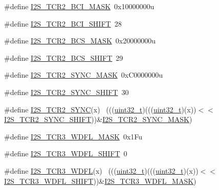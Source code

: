 \begin{DoxyCompactItemize}
\item 
\#define \hyperlink{group___i2_s___register___masks_ga1e16e8f58e2213ea6ea8fbe96f6b0b09}{I2\+S\+\_\+\+T\+C\+R2\+\_\+\+B\+C\+I\+\_\+\+M\+A\+SK}~0x10000000u
\item 
\#define \hyperlink{group___i2_s___register___masks_gaa9612abbad00a02a4d3dc1a7dfe6463d}{I2\+S\+\_\+\+T\+C\+R2\+\_\+\+B\+C\+I\+\_\+\+S\+H\+I\+FT}~28
\item 
\#define \hyperlink{group___i2_s___register___masks_ga8969a374d290181e8f2c7a1c5ff4f31b}{I2\+S\+\_\+\+T\+C\+R2\+\_\+\+B\+C\+S\+\_\+\+M\+A\+SK}~0x20000000u
\item 
\#define \hyperlink{group___i2_s___register___masks_ga4f9b5cf67219ec5115ced3b69bfda155}{I2\+S\+\_\+\+T\+C\+R2\+\_\+\+B\+C\+S\+\_\+\+S\+H\+I\+FT}~29
\item 
\#define \hyperlink{group___i2_s___register___masks_ga2626d37b42ede711d867e8f750fb2c2c}{I2\+S\+\_\+\+T\+C\+R2\+\_\+\+S\+Y\+N\+C\+\_\+\+M\+A\+SK}~0x\+C0000000u
\item 
\#define \hyperlink{group___i2_s___register___masks_ga7817b4e017fd01d7ca9a59e87008656f}{I2\+S\+\_\+\+T\+C\+R2\+\_\+\+S\+Y\+N\+C\+\_\+\+S\+H\+I\+FT}~30
\item 
\#define \hyperlink{group___i2_s___register___masks_ga09f26fa241803f9f821314538bfa520b}{I2\+S\+\_\+\+T\+C\+R2\+\_\+\+S\+Y\+NC}(x)                                              ~(((\hyperlink{_p_e___types_8h_a33594304e786b158f3fb30289278f5af}{uint32\+\_\+t})(((\hyperlink{_p_e___types_8h_a33594304e786b158f3fb30289278f5af}{uint32\+\_\+t})(x))$<$$<$\hyperlink{group___i2_s___register___masks_ga7817b4e017fd01d7ca9a59e87008656f}{I2\+S\+\_\+\+T\+C\+R2\+\_\+\+S\+Y\+N\+C\+\_\+\+S\+H\+I\+FT}))\&\hyperlink{group___i2_s___register___masks_ga2626d37b42ede711d867e8f750fb2c2c}{I2\+S\+\_\+\+T\+C\+R2\+\_\+\+S\+Y\+N\+C\+\_\+\+M\+A\+SK})
\item 
\#define \hyperlink{group___i2_s___register___masks_ga49de2df89ebdb02cdb32c8a15f9ac7b4}{I2\+S\+\_\+\+T\+C\+R3\+\_\+\+W\+D\+F\+L\+\_\+\+M\+A\+SK}~0x1\+Fu
\item 
\#define \hyperlink{group___i2_s___register___masks_ga984179c79c4fc833f32c031c69a33cd9}{I2\+S\+\_\+\+T\+C\+R3\+\_\+\+W\+D\+F\+L\+\_\+\+S\+H\+I\+FT}~0
\item 
\#define \hyperlink{group___i2_s___register___masks_gae18017d62dcbde7881d963b3217d0743}{I2\+S\+\_\+\+T\+C\+R3\+\_\+\+W\+D\+FL}(x)                                              ~(((\hyperlink{_p_e___types_8h_a33594304e786b158f3fb30289278f5af}{uint32\+\_\+t})(((\hyperlink{_p_e___types_8h_a33594304e786b158f3fb30289278f5af}{uint32\+\_\+t})(x))$<$$<$\hyperlink{group___i2_s___register___masks_ga984179c79c4fc833f32c031c69a33cd9}{I2\+S\+\_\+\+T\+C\+R3\+\_\+\+W\+D\+F\+L\+\_\+\+S\+H\+I\+FT}))\&\hyperlink{group___i2_s___register___masks_ga49de2df89ebdb02cdb32c8a15f9ac7b4}{I2\+S\+\_\+\+T\+C\+R3\+\_\+\+W\+D\+F\+L\+\_\+\+M\+A\+SK})

\end{DoxyCompactItemize}
